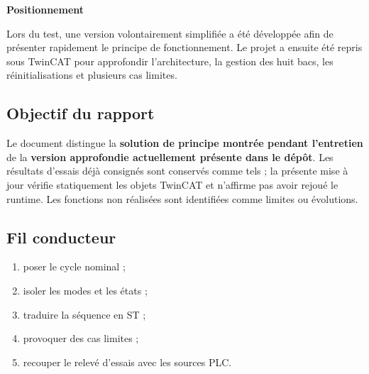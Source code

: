 
\noindent
\begin{minipage}[t]{0.355\textwidth}\vspace{0pt}
  \begin{primarycard}
    \textbf{Positionnement}\par\small
    Lors du test, une version volontairement simplifiée a été développée afin de présenter rapidement le principe de fonctionnement. Le projet a ensuite été repris sous TwinCAT pour approfondir l'architecture, la gestion des huit bacs, les réinitialisations et plusieurs cas limites.
  \end{primarycard}

  \subsection{Objectif du rapport}
  \small
  Le document distingue la \textbf{solution de principe montrée pendant l'entretien} de la \textbf{version approfondie actuellement présente dans le dépôt}. Les résultats d'essais déjà consignés sont conservés comme tels ; la présente mise à jour vérifie statiquement les objets TwinCAT et n'affirme pas avoir rejoué le runtime. Les fonctions non réalisées sont identifiées comme limites ou évolutions.

  \subsection{Fil conducteur}
  \begin{enumerate}\small
    \item poser le cycle nominal ;
    \item isoler les modes et les états ;
    \item traduire la séquence en ST ;
    \item provoquer des cas limites ;
    \item recouper le relevé d'essais avec les sources PLC.
  \end{enumerate}
\end{minipage}\hfill
